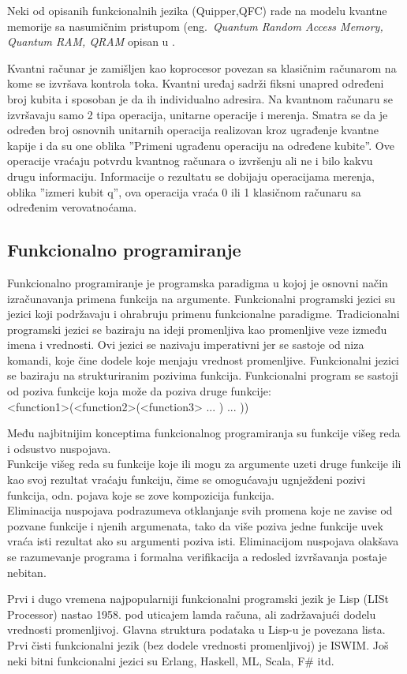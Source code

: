 \documentclass[a4paper]{article}
\begin{document}
{Neki od opisanih funkcionalnih jezika (Quipper,QFC) rade na modelu kvantne memorije sa nasumičnim pristupom (eng.~\emph{Quantum Random Access Memory, Quantum RAM, QRAM} opisan u \cite{qram_model}.

Kvantni računar je zamišljen kao koprocesor povezan sa klasičnim računarom na kome se izvršava kontrola toka. Kvantni uređaj sadrži fiksni unapred određeni broj kubita i sposoban je da ih individualno adresira. Na kvantnom računaru se izvršavaju samo 2 tipa operacija, unitarne operacije i merenja.  Smatra se da je određen broj osnovnih unitarnih operacija realizovan kroz ugrađenje kvantne kapije i da su one oblika ''Primeni ugrađenu operaciju na određene kubite''. Ove operacije vraćaju potvrdu kvantnog računara o izvršenju ali ne i bilo kakvu drugu informaciju. Informacije o rezultatu se dobijaju operacijama merenja, oblika ''izmeri kubit q'', ova operacija vraća 0 ili 1 klasičnom računaru sa određenim verovatnoćama.

\subsection{Funkcionalno programiranje}
\label{sec:funkcionalniprgjezici}

Funkcionalno programiranje je programska paradigma u kojoj je osnovni način izračunavanja primena funkcija na argumente.\cite[p. 3]{funcPro}
Funkcionalni programski jezici su jezici koji podržavaju i ohrabruju primenu funkcionalne paradigme.
Tradicionalni programski jezici se baziraju na ideji promenljiva kao promenljive veze između imena i vrednosti. Ovi jezici se nazivaju 
imperativni jer se sastoje od niza komandi, koje čine dodele koje menjaju vrednost promenljive.
Funkcionalni jezici se baziraju na strukturiranim pozivima funkcija. Funkcionalni program se sastoji od poziva funkcije koja može da
poziva druge funkcije:\\
<function1>(<function2>(<function3> ... ) ... ))\cite[p. 4]{funcPro}

Među najbitnijim konceptima funkcionalnog programiranja su funkcije višeg reda i odsustvo nuspojava. \\
Funkcije višeg reda su funkcije koje ili mogu za argumente uzeti druge funkcije ili kao svoj rezultat vraćaju funkciju, čime se omogućavaju ugnježdeni pozivi funkcija, odn. pojava koje se zove kompozicija funkcija.\\
Eliminacija nuspojava podrazumeva otklanjanje svih promena koje ne zavise od pozvane funkcije i njenih argumenata, tako da više poziva jedne funkcije uvek vraća isti rezultat ako su argumenti poziva isti. Eliminacijom nuspojava olakšava se razumevanje programa i formalna 
verifikacija a redosled izvršavanja postaje nebitan.\par
Prvi i dugo vremena najpopularniji funkcionalni programski jezik je Lisp (LISt Processor) nastao 1958. pod uticajem lamda računa, ali 
zadržavajući dodelu vrednosti promenljivoj. Glavna struktura podataka u Lisp-u je povezana lista. Prvi čisti funkcionalni jezik 
(bez dodele vrednosti promenljivoj) je ISWIM. Još neki bitni funkcionalni jezici su Erlang, Haskell, ML, Scala, F\# itd.

}
\end{document}
